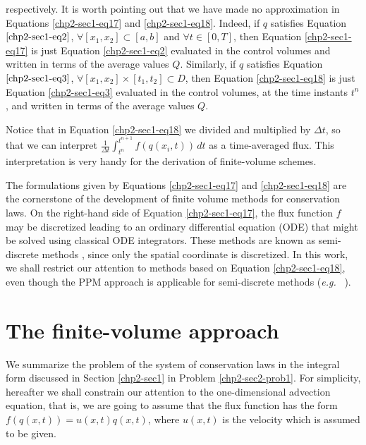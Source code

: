 respectively.
It is worth pointing out that we have made no approximation in Equations
\eqref{chp2-sec1-eq17} and \eqref{chp2-sec1-eq18}. Indeed, if ${q}$ satisfies Equation
$\eqref{chp2-sec1-eq2}$, $\forall [x_1, x_2] \subset [a,b]$ and $\forall t \in [0,T]$,
then Equation \eqref{chp2-sec1-eq17} is just Equation
\eqref{chp2-sec1-eq2} evaluated in the control volumes and written
in terms of the average values ${Q}$. 
Similarly, if ${q}$ satisfies Equation
$\eqref{chp2-sec1-eq3}$, $\forall [x_1, x_2] \times [t_1, t_2] \subset D$,
then Equation \eqref{chp2-sec1-eq18} is just Equation
\eqref{chp2-sec1-eq3} evaluated in the control volumes,
at the time instants $t^{n}$, and written
in terms of the average values ${Q}$.

Notice that in Equation \eqref{chp2-sec1-eq18} we divided and multiplied by $\Delta t$, so that 
we can interpret $\frac{1}{\Delta t}\int_{t^{n}}^{t^{n+1}}
{f}({q}(x_{i}, t)) \,dt $ as a time-averaged flux.
This interpretation is very handy for the derivation of finite-volume schemes.

The formulations given by Equations \eqref{chp2-sec1-eq17} and \eqref{chp2-sec1-eq18} are the cornerstone 
of the development of finite volume methods for conservation laws. 
On the right-hand side of Equation \eqref{chp2-sec1-eq17}, the flux function ${f}$ 
may be discretized leading to an ordinary differential equation (ODE)
that might be solved using classical ODE integrators.
These methods are known as semi-discrete methods \citep{leveque:2002}, since only the spatial coordinate is discretized.
In this work, we shall restrict our attention to methods based on Equation \eqref{chp2-sec1-eq18},
even though the PPM approach is applicable for semi-discrete methods (\textit{e.g.} \ \citet{suresh:1997}).

\section{The finite-volume approach}
\label{chp2-sec2}
We summarize the problem of the system of conservation laws in the integral form 
discussed in Section \ref{chp2-sec1} in Problem \ref{chp2-sec2-prob1}.
For simplicity, hereafter we shall constrain our attention to the one-dimensional advection equation, 
that is, we are going to assume that the flux function has the form 
$f(q(x,t)) = u(x,t)q(x,t)$, where $u(x,t)$ is the velocity which is assumed to be given.

